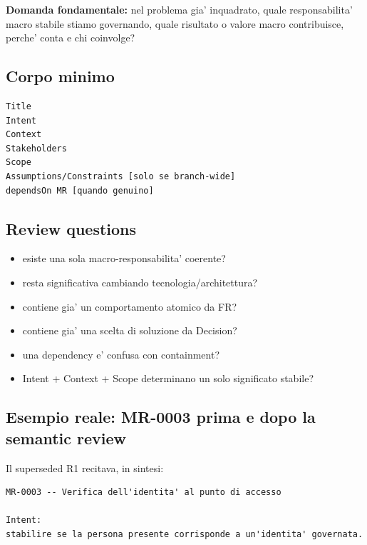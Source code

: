 \documentclass[11pt,a4paper]{article}
\begin{document}
\begin{statusclosed}
\textbf{Domanda fondamentale:} nel problema gia' inquadrato, quale responsabilita' macro stabile stiamo governando, quale risultato o valore macro contribuisce, perche' conta e chi coinvolge?
\end{statusclosed}

\subsection{Corpo minimo}

\begin{lstlisting}
Title
Intent
Context
Stakeholders
Scope
Assumptions/Constraints [solo se branch-wide]
dependsOn MR [quando genuino]
\end{lstlisting}

\subsection{Review questions}

\begin{itemize}
\item esiste una sola macro-responsabilita' coerente?
\item resta significativa cambiando tecnologia/architettura?
\item contiene gia' un comportamento atomico da FR?
\item contiene gia' una scelta di soluzione da Decision?
\item una dependency e' confusa con containment?
\item Intent + Context + Scope determinano un solo significato stabile?
\end{itemize}

\subsection{Esempio reale: MR-0003 prima e dopo la semantic review}

Il superseded R1 recitava, in sintesi:

\begin{examplebox}
\begin{lstlisting}
MR-0003 -- Verifica dell'identita' al punto di accesso

Intent:
stabilire se la persona presente corrisponde a un'identita' governata.
\end{lstlisting}
\end{examplebox}
\end{document}
